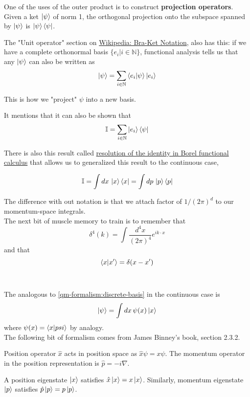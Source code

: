 One of the uses of the outer product is to construct \textbf{projection operators}. Given a ket $\ket{\psi}$
of norm 1, the orthogonal projection onto the subspace spanned by $\ket{\psi}$ is $\ket{\psi}\bra{\psi}$.


The "Unit operator" section on \href{https://en.wikipedia.org/wiki/Bra%E2%80%93ket_notation}{Wikipedia: Bra-Ket Notation},
also has this: if we have a complete orthonormal basis $\{ e_i | i\in\mathbb{N} \}$,
functional analysis tells us that any $\ket{\psi}$ can also be written as
\begin{equation}
\ket{\psi} =
\sum_{i\in\mathbb{N}} \braket{e_i | \psi} \ket{e_i} \label{qm-formalism:discrete-basis}
\end{equation}

This is how we "project" $\psi$ into a new basis.

It mentions that it can also be shown that
$$
\mathbb{I} = \sum_{i\in\mathbb{N}} \ket{e_i} \bra{\psi}
$$

There is also this result called
\href{https://en.wikipedia.org/wiki/Borel_functional_calculus#Resolution_of_the_identity}{resolution of the identity in Borel functional calculus}
that allows us to generalized this result to the continuous case,

$$
\mathbb{I} = \int dx \, \ket{x} \bra{x} = \int dp \, \ket{p} \bra{p}
$$

The difference with out notation is that we attach factor of $1/(2\pi)^d$ to our momentum-space integrals.
\\

The next bit of muscle memory to train is to remember that
$$
\delta^{4} (k) = \int \frac{d^4x}{(2\pi)^4} e^{ik\cdot x}
$$
and that
$$
\braket{x | x^\prime} = \delta(x - x^\prime)
$$
\\~\\


The analogous to \ref{qm-formalism:discrete-basis} in the continuous case is
$$
\ket{\psi} = \int dx\, \psi(x) \ket{x}
$$
where $\psi (x) = \braket{x | psi}$ by analogy.
\\




The following bit of formalism comes from James Binney's book, section 2.3.2.

Position operator $\hat{x}$ acts in position space as $\hat{x} \psi = x\psi$.
The momentum operator in the position representation is $\hat{p} = -i\nabla$.

A position eigenstate $\ket{x}$ satisfies $\hat{x}\ket{x} = x\ket{x}$.
Similarly, momentum eigenstate $\ket{p}$ satisfies $\hat{p}\ket{p} = p\ket{p}$.

